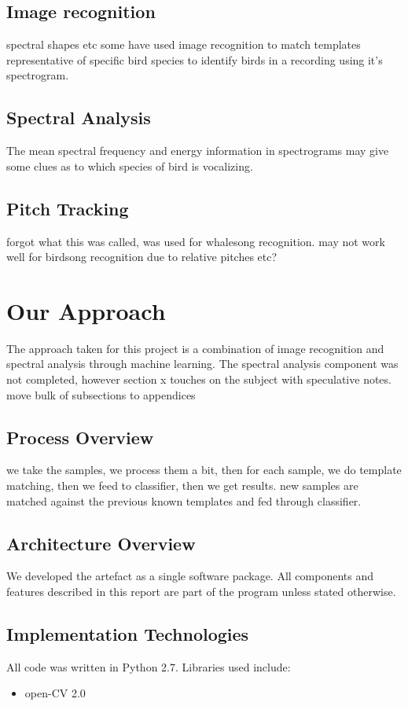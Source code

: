 \subsection{Image recognition}
spectral shapes etc
some have used image recognition to match templates representative of specific
bird species to identify birds in a recording using it's spectrogram.

\subsection{Spectral Analysis}
The mean spectral frequency and energy information in spectrograms may give some
clues as to which species of bird is vocalizing.

\subsection{Pitch Tracking}
forgot what this was called, was used for whalesong recognition.
may not work well for birdsong recognition due to relative pitches etc?

\section{Our Approach}
The approach taken for this project is a combination of image recognition and
spectral analysis through machine learning.
The spectral analysis component was not completed, however section x touches on
the subject with speculative notes.\\

move bulk of subsections to appendices

\subsection{Process Overview}
we take the samples, we process them a bit, then for each sample, we do template
matching, then we feed to classifier, then we get results. new samples are
matched against the previous known templates and fed through classifier.

\subsection{Architecture Overview}
We developed the artefact as a single software package.
All components and features described in this report are part of the program
unless stated otherwise.

\subsection{Implementation Technologies}
All code was written in Python 2.7.
Libraries used include:
\begin{itemize}
  \item open-CV 2.0
\end{itemize}
